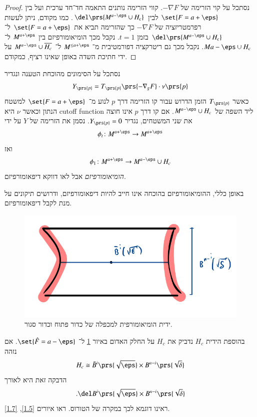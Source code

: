 \documentclass[a4paper,10pt,twoside,openany]{book}
\begin{document}
\begin{proof}
נסתכל על קוי הזרימה של
$-\nabla F$.
קווי הזרימה נותנים התאמה חד־חד ערכית ועל בין
$\set{F = a + \eps}$
לבין
$\del\prs{M^{a-\eps} \cup H_c}$.
כמו מקודם, ניתן לעשות רפרמטריזציה של
$-\nabla F$
כך שהזרימה תביא את
$\set{F = a + \eps}$
ל־%
$\del\prs{M^{a-\eps} \cup H_c}$
בזמן
$t = 1$.
נקבל מכך הומיאומורפיזם בין
$M^{a+\eps}$
ל־%
$M{a-\eps} \cup H_c$.
נקבל מכך גם ריטרקציה דפורמטיבית מ־%
$M^{\leq a + \eps}$
ל־%
$M^{a - \eps} \cup \overline{H_c}$
על ידי חתיכת השדה באופן שאינו רציף, כמקודם.
\end{proof}


\begin{remark}
נסתכל על הסימונים מהוכחת הטענה ונגדיר
\[Y_{\prs{p}} = {T_{\prs{p}}} \prs{- \nabla_g F} \cdot \nu\prs{p}\]
כאשר
$T_{\prs{p}}$
הזמן הדרוש עבור קו הזרימה דרך
$p$
לנוע מ־%
$\set{F = a + \eps}$
למשטח הנתון וכאשר
$\nu$
היא
\textenglish{cutoff function}
ליד השפה של
$M^{a-\eps} \cup H_c$.
אם קו דרך
$p$
אינו חוצה את שני המשטחים, נגדיר
$Y_{\prs{p}} = 0$.
נסמן את הזרימה של
$Y$
על ידי
\[\phi_t \colon M^{a+\eps} \to M^{a + \eps}\]
ואז
\[\phi_1 \colon M^{a+\eps} \to M^{a-\eps} \cup H_c\]
\emph{הומיאומורפיזם}
אבל לאו דווקא דיפאומורפיזם.

באופן כללי, ההומיאומורפיזם בהוכחה אינו חייב להיות דיפאומורפיזם, ודרושים תיקונים על מנת לקבל דיפאומורפיזם.
\end{remark}

\begin{remark}

\begin{figure}
\centering
\includegraphics[scale=0.5]{sources/3.1}
\caption{ידית הומיאומורפית למכפלה של כדור פתוח וכדור סגור.}
\label{3.1}
\end{figure}

בהוספת הידית
$H_c$
נדביק את
$H_c$
על החלק האדום באיור
\ref{3.1}
ל־%
$\set{\hat{F} = a-\eps}$.
אם נזהה
\[H_c \cong \bar{B}^i\prs{\sqrt{\eps}} \times B^{n-i}\prs{\sqrt{\delta}}\]
הדבקה זאת היא לאורך
\[\text{.} \del B^i\prs{\sqrt{\eps}} \times B^{n-i}\prs{\sqrt{\delta}}\]
ראינו דוגמא לכך במקרה של הטורוס. ראו איורים
\ref{1.5}, \ref{1.7}.
\end{remark}
\end{document}
